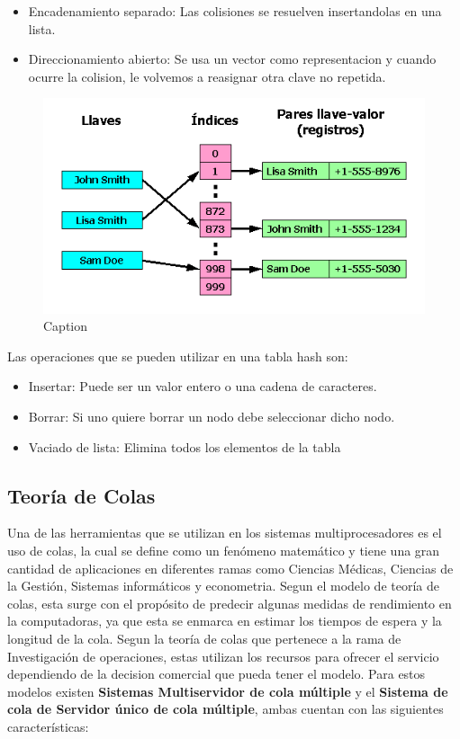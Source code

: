 \documentclass[conference,letterpaper]{IEEEtran}
\begin{document}
\begin{itemize}
    \item Encadenamiento separado: Las colisiones se resuelven insertandolas en una lista.
    \item Direccionamiento abierto: Se usa un vector como representacion y cuando ocurre la colision, le volvemos a reasignar otra clave no repetida.
\end{itemize}

\begin{figure}[thpb]
    \centering
    \includegraphics[width=0.55\linewidth]{Tabla_hash1.png}
    \caption{Caption}
    \label{fig:hash}
\end{figure}

Las operaciones que se pueden utilizar en una tabla hash son:
\begin{itemize}
    \item Insertar: Puede ser un valor entero o una cadena de caracteres.
    \item Borrar: Si uno quiere borrar un nodo debe seleccionar dicho nodo.
    \item Vaciado de lista: Elimina todos los elementos de la tabla
\end{itemize}

\subsection{Teor\'ia de Colas}
Una de las herramientas que se utilizan en los sistemas multiprocesadores es el uso de colas, la cual se define como un fen\'omeno matem\'atico y tiene una gran cantidad de aplicaciones en diferentes ramas como Ciencias M\'edicas, Ciencias de la Gesti\'on, Sistemas inform\'aticos y econometria. Segun el modelo de teor\'ia de colas, esta surge con el prop\'osito de predecir algunas medidas de rendimiento en la computadoras, ya que esta se enmarca en estimar los tiempos de espera y la longitud de la cola. Segun la teor\'ia de colas que pertenece a la rama de Investigaci\'on de operaciones, estas utilizan los recursos para ofrecer el servicio dependiendo de la decision comercial que pueda tener el modelo. Para estos modelos existen \textbf{Sistemas Multiservidor de cola m\'ultiple} y el \textbf{Sistema de cola de Servidor \'unico de cola m\'ultiple}, ambas cuentan con las siguientes caracter\'isticas:
\end{document}
